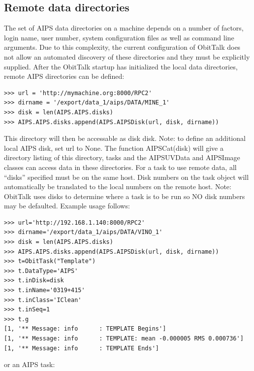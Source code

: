 \documentclass[11pt]{report}
\begin{document}
\subsection{Remote data directories\label{remote_data}}
The set of AIPS data directories on a machine depends on a number of
factors, login name, user number, system configuration files as well
as command line arguments.
Due to this complexity, the current configuration of ObitTalk does not
allow an automated discovery of these directories and they must be
explicitly supplied.
After the ObitTalk startup has initialized the local data directories,
remote AIPS directories can be defined:

\begin{verbatim}
>>> url = 'http://mymachine.org:8000/RPC2'
>>> dirname = '/export/data_1/aips/DATA/MINE_1'
>>> disk = len(AIPS.AIPS.disks)
>>> AIPS.AIPS.disks.append(AIPS.AIPSDisk(url, disk, dirname))
\end{verbatim}
This directory will then be accessable as disk disk.
Note: to define an additional local AIPS disk, set url to None.
The function AIPSCat(disk) will give a directory listing of this
directory, tasks and the AIPSUVData and AIPSImage classes can access
data in these directories.
For a task to use remote data, all ``disks'' specified must be on the
same host.
Disk numbers on the task object will automatically be translated to
the  local numbers on the remote host.
Note: ObitTalk uses disks to determine where a task is to be run so NO
disk numbers may be defaulted.
Example usage follows:
\begin{verbatim}
>>> url='http://192.168.1.140:8000/RPC2'
>>> dirname='/export/data_1/aips/DATA/VINO_1'
>>> disk = len(AIPS.AIPS.disks)
>>> AIPS.AIPS.disks.append(AIPS.AIPSDisk(url, disk, dirname))
>>> t=ObitTask("Template")
>>> t.DataType='AIPS'
>>> t.inDisk=disk
>>> t.inName='0319+415'
>>> t.inClass='IClean'
>>> t.inSeq=1
>>> t.g
[1, '** Message: info      : TEMPLATE Begins']
[1, '** Message: info      : TEMPLATE: mean -0.000005 RMS 0.000736']
[1, '** Message: info      : TEMPLATE Ends']
\end{verbatim}
or an AIPS task:
\end{document}
